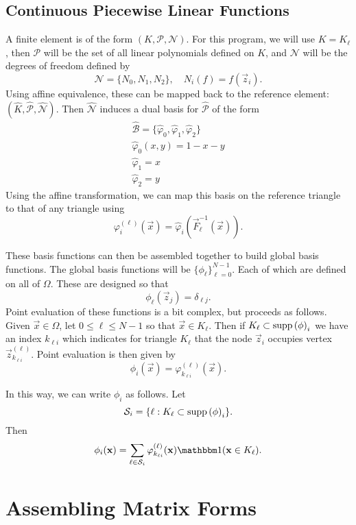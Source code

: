 \documentclass{article}
\begin{document}
\subsection{Continuous Piecewise Linear Functions}

A finite element is of the form $(K, \mathcal P, \mathcal N)$.
For this program, we will use $K = K_\ell$, then
$\mathcal P$ will be the set of all linear polynomials defined on $K$,
and $\mathcal N$ will be the degrees of freedom defined by
\[
		\mathcal N = \{N_0, N_1, N_2\}, \quad 
		N_i(f) = f(\vec z_i)
.\] 
Using affine equivalence, these can be mapped back to the reference element:
$(\hat K, \hat{\mathcal P}, \hat{\mathcal N})$.  
Then $\hat{\mathcal N}$ induces a dual basis for $\hat{\mathcal P}$ of 
the form
\begin{gather}
		\hat{\mathcal B} = \{\hat \varphi_0, \hat \varphi_1, \hat \varphi_2\}
		\\
		\hat \varphi_0(x, y) = 1 - x - y \\
		\hat \varphi_1 = x \\
		\hat \varphi_2 = y
\end{gather}
Using the affine transformation, we can map this basis on the 
reference triangle to that of any triangle using
\[
		\varphi^{(\ell)}_i(\vec x) = 
		\hat \varphi_i(\vec F^{-1}_\ell(\vec x))
.\] 

These basis functions can then be assembled together to build global 
basis functions.  The global basis functions will be 
$\{\phi_\ell\}_{\ell=0}^{N-1}$.  Each of which are defined on 
all of $\Omega$.  These are designed so that 
\[
		\phi_\ell(\vec z_j) = \delta_{\ell j}
.\] 
Point evaluation of these functions is a bit complex, but proceeds as 
follows.  
Given $\vec x \in \Omega$, let $0 \leq \ell \leq N - 1$ so that 
$\vec x \in K_\ell$.  Then if 
$K_\ell \subset \mathrm{supp}\left( \phi \right)_i$ we have an index $k_{\ell i}$ which
indicates for triangle $K_\ell$ that the node $\vec z_i$ occupies
vertex $\vec z_{k_{\ell i}}^{(\ell)}$.
Point evaluation is then given by
\[
		\phi_i(\vec x) = \varphi_{k_{\ell i}}^{(\ell)}(\vec x)
.\] 

In this way, we can write $\phi_i$ as follows. 
Let 
\[
		\mathcal S_i = \{\ell : K_\ell \subset \mathrm{supp}\left( \phi \right)_i\}
.\] 
Then 
\[
		\phi_i(\vec x) = \sum_{\ell \in \mathcal S_i} 
		\varphi_{k_{\ell i}}^{(\ell)}(\vec x) 
		\mathbbm 1(\vec x \in K_\ell)
.\] 


\section{Assembling Matrix Forms}
\end{document}
